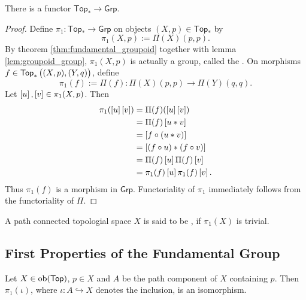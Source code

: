\begin{proposition}
	There is a functor $\mathsf{Top}_\ast \to \mathsf{Grp}$.
\end{proposition}

\begin{proof}
	Define $\pi_1 : \mathsf{Top}_\ast \to \mathsf{Grp}$ on objects $(X,p) \in \mathsf{Top}_\ast$ by 
	\begin{equation*}
		\pi_1(X,p) := \Pi(X)(p,p).
	\end{equation*}
	By theorem \ref{thm:fundamental_groupoid} together with lemma \ref{lem:groupoid_group}, $\pi_1(X,p)$ is actually a group, called the . On morphisms $f \in \mathsf{Top}_\ast\del[1]{(X,p),(Y,q)}$, define 
	\begin{equation*}
		\pi_1(f) := \Pi(f) : \Pi(X)(p,p) \to \Pi(Y)(q,q).
	\end{equation*}
	Let $\sbr{u},\sbr{v} \in \pi_1(X,p)$. Then 
	\begin{align*}
		\pi_1(\sbr{u}\sbr{v}) &= \Pi(f)(\sbr{u}\sbr{v})\\
		&= \Pi(f)\sbr{u \ast v}\\
		&= \sbr[0]{f \circ (u \ast v)}\\
		&= \sbr[0]{(f \circ u) \ast (f \circ v)}\\
		&= \Pi(f)\sbr{u} \Pi(f)\sbr{v}\\
		&= \pi_1(f)\sbr{u}\pi_1(f)\sbr{v}.
	\end{align*}
	Thus $\pi_1(f)$ is a morphism in $\mathsf{Grp}$. Functoriality of $\pi_1$ immediately follows from the functoriality of $\Pi$.
\end{proof}

\begin{definition}
	A path connected topologial space $X$ is said to be , if $\pi_1(X)$ is trivial.
\end{definition}

\subsection*{First Properties of the Fundamental Group}
\begin{lemma}
	Let $X \in \operatorname{ob}(\mathsf{Top})$, $p \in X$ and $A$ be the path component of $X$ containing $p$. Then $\pi_1(\iota)$, where $\iota : A \hookrightarrow X$ denotes the inclusion, is an isomorphism.
\end{lemma}

